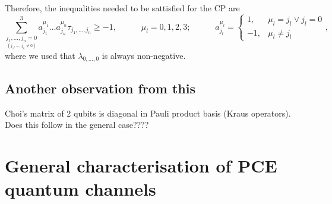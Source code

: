 \documentclass[11pt,dvipsnames]{article} %
\newcommand{\1}{\mathds{1}}
\begin{document}
Therefore, the inequalities needed to be sattisfied for the CP are
\begin{equation}\label{eq:inequalities-PCE}
\sum_{\underset{(j_1,\ldots,j_n\neq0)}{j_1,\ldots,j_n=0}}^3
a_{j_1}^{\mu_1}\ldots a_{j_n}^{\mu_n}\tau_{j_1,\ldots,j_n}
\geq
-1,
\hspace{35pt}
\mu_l=0,1,2,3;
\hspace{35pt}
a_{j_l}^{\mu_l}=\left\{ \begin{array}{rl}
             1, & \mu_l=j_l \lor j_l=0\\
             -1, & \mu_l\neq j_l
             \end{array}
   \right.,
\end{equation}
where we used that $\lambda_{0,\ldots,0}$ is always non-negative.
\subsection*{Another observation from this} %
Choi's matrix of 2 qubits is diagonal in Pauli product basis
(Kraus operators). Does this follow in the general case???? 
\section*{General characterisation of PCE quantum channels} %
\end{document}
